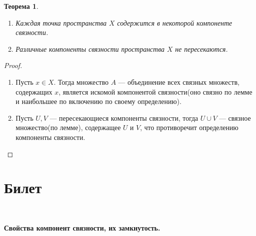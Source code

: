 \documentclass[a4paper,100pt]{article}
\theoremstyle{indented}
\newtheorem{theorem}{Теорема}
\begin{document}
    \begin{theorem}
        \begin{enumerate}
            \item Каждая точка пространства $X$ содержится в некоторой компоненте связности.
            \item Различные компоненты связности пространства $X$ не пересекаются.
        \end{enumerate}
    \end{theorem}
    
    \begin{proof} \textcolor{white}{-}\\
    \begin{enumerate}
        \item Пусть $x \in X$. Тогда множество $A$ --- объединение всех связных множеств, содержащих $x$, является искомой компонентой связности(оно связно по лемме и наибольшее по включению по своему определению).
        \item Пусть $U,V$ --- пересекающиеся компоненты связности, тогда $U \cup V$ --- связное множество(по лемме), содержащее $U$ и $V$, что противоречит определению компоненты связности.
    \end{enumerate}
    \end{proof}


\section{Билет} \

\medskip

\textbf{Свойства компонент связности, их замкнутость.}\\
\end{document}
